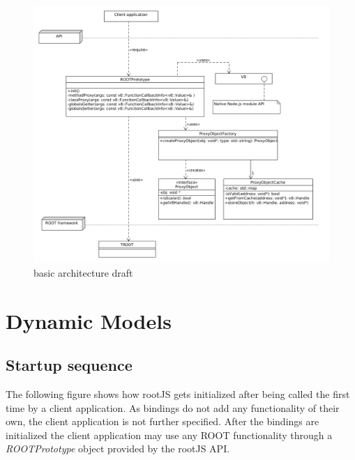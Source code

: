\begin{figure}[htb]
	\centering
	\includegraphics[width=18cm]{./latex/resources/architecture.png}
	\caption{basic architecture draft}
\end{figure}
\pagebreak

\section{Dynamic Models}


\subsection{Startup sequence}
The following figure shows how rootJS gets initialized after being called the first time by a client application. As bindings do not add any functionality of their own, the client application is not further specified. After the bindings are initialized the client application may use any ROOT functionality through a \textit{ROOTPrototype} object provided by the rootJS API.


